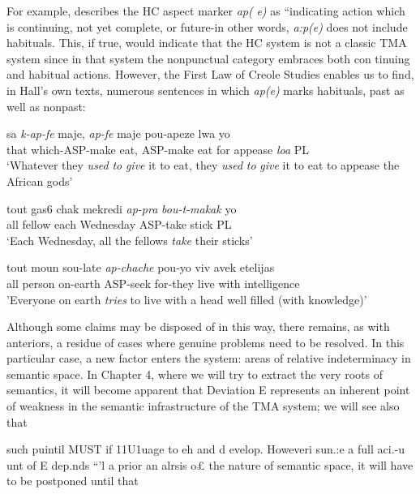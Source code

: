 For example, \citet[31]{Hall1953} describes the HC aspect marker \textit{ap(} \textit{e}\textit{)} as ``indicating action which is continuing, not yet complete, or future{\textquotedbl}{}-in other words, \textit{a:p}\textit{(}\textit{e}\textit{) }does not include habituals. This, if true, would indicate that the HC system is not a classic TMA system since in that system the nonpunctual category embraces both con%
tinuing and habitual actions. However, the First Law of Creole Studies enables us to find, in Hall's own texts, numerous sentences in which \textit{ap(e)} marks habituals, past as well as nonpast:

\ea\label{ex:2:122}
\gll sa \textit{k-ap-fe} maje, \textit{ap-fe} maje pou-apeze lwa yo\\
that which-ASP-make eat, ASP-make eat for appease \textit{loa} PL\\
\glt `Whatever they \textit{used} \textit{to} \textit{give} it to eat, they \textit{used} \textit{to} \textit{give} it to eat to appease the African gods'
\z





\ea\label{ex:2:123}
 \gll tout gas6 chak mekredi \textit{ap-pra} \textit{bou-t-makak} yo\\
all fellow each Wednesday ASP-take stick PL\\
\glt `Each Wednesday, all the fellows \textit{take} their sticks'
\z



\ea\label{ex:2:124}
\gll tout moun sou-late \textit{ap-chache} pou-yo viv avek etelijas\\
all person on-earth ASP-seek for-they live with intelligence\\
\glt  'Everyone on earth \textit{tries }to live with a head well filled (with knowledge)'
\z


Although some claims may be disposed of in this way, there remains, as with anteriors, a residue of cases where genuine problems need to be resolved. In this particular case, a new factor enters the system: areas of relative indeterminacy in semantic space. In Chapter 4, where we will try to extract the very roots of semantics, it will become apparent that Deviation E represents an inherent point of weakness in the semantic infrastructure of the TMA system; we will see also that

such puintil MUST if 11U1uage to eh and d evelop. Howeveri sun.:e a full aci.-u unt of E dep.nds ``'l a prior an alrsis o£ the nature of semantic space, it will have to be postponed until that

